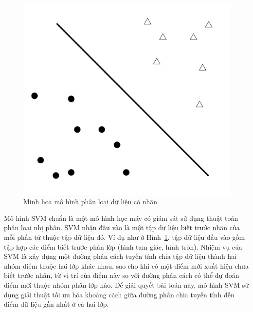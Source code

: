 \begin{figure}[h]
\centering
\includegraphics[scale=0.5]{hinh/SVM1.png}
\caption{Minh họa mô hình phân loại dữ liệu có nhãn}
\label{fig:dataclassify}
\end{figure}
\pagebreak
Mô hình SVM chuẩn là một mô hình học máy có giám sát sử dụng thuật toán phân loại nhị phân. SVM nhận đầu vào là một tập dữ liệu biết trước nhãn của mỗi phần tử thuộc tập dữ liệu đó. Ví dụ như ở Hình~\ref{fig:dataclassify}, tập dữ liệu đầu vào gồm tập hợp các điểm biết trước phân lớp (hình tam giác, hình tròn). Nhiệm vụ của SVM là xây dựng một đường phân cách tuyến tính chia tập dữ liệu thành hai nhóm điểm thuộc hai lớp khác nhau, sao cho khi có một điểm mới xuất hiện chưa biết trước nhãn, từ vị trí của điểm này so với đường phân cách có thể dự đoán điểm mới thuộc nhóm phân lớp nào. Để giải quyết bài toán này, mô hình SVM sử dụng giải thuật tối ưu hóa khoảng cách giữa đường phân chia tuyến tính đến điểm dữ liệu gần nhất ở cả hai lớp.
